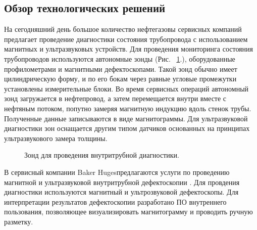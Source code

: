 \documentclass[a4paper,article,14pt]{extarticle}
\begin{document}
\subsection{Обзор технологических решений}

На сегодняшний день большое количество нефтегазовы сервисных компаний предлагает проведение диагностики состояния 
трубопровода с использованием магнитных и ультразвуковых устройств. Для проведения мониторинга состояния трубопроводов 
используются автономные зонды (Рис. ~\ref{image1}.), оборудованные профилометрами и магнитными дефектоскопами. Такой зонд обычно имеет 
цилиндрическую форму, и по его бокам через равные угловые промежутки установлены измерительные блоки. Во время сервисных 
операций автономный зонд загружается в нефтепровод, а затем перемещается внутри вместе с нефтяным потоком, попутно замеряя 
магнитную индукцию вдоль стенок трубы. Полученные данные записываются в виде магнитограммы. Для ультразвуковой диагностики зон 
оснащается другим типом датчиков основанных на принципах ультразвукового замера толщины.

\begin{figure}[ht]
    \begin{center}
    
    \caption{
    \label{image1}
    Зонд для проведения внутритрубной диагностики.}
    \end {center}
\end {figure}

В сервисный компании \frqq Baker Huges\flqq предлагаются услуги по проведению магнитной и ультразвуковой внутритрубной дефектоскопии \cite{s2}.
Для провдения диагностики используются магнитный и ультрозвуковой дефектоскопы. Для интерпретации результатов дефектоскопии 
разработано ПО внутреннего пользования, позволяющее визуализировать магнитограмму и проводить ручную разметку.
\end{document}
